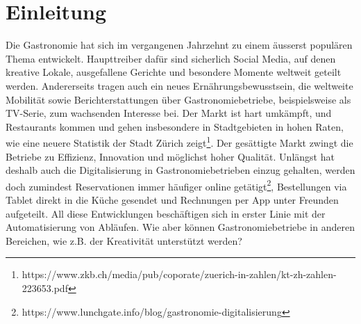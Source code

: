 \section*{Einleitung}
\label{sec:introduction}

Die Gastronomie hat sich im vergangenen Jahrzehnt zu einem äusserst populären Thema entwickelt.
Haupttreiber dafür sind sicherlich Social Media, auf denen kreative Lokale, ausgefallene Gerichte und besondere
Momente weltweit geteilt werden.
Andererseits tragen auch ein neues Ernährungsbewusstsein, die weltweite Mobilität sowie Berichterstattungen über Gastronomiebetriebe, beispielsweise als TV-Serie, zum wachsenden Interesse bei.
Der Markt ist hart umkämpft, und Restaurants kommen und gehen insbesondere in Stadtgebieten in hohen Raten, wie eine neuere
Statistik der Stadt Zürich zeigt\footnote{https://www.zkb.ch/media/pub/coporate/zuerich-in-zahlen/kt-zh-zahlen-223653.pdf}.
Der gesättigte Markt zwingt die Betriebe zu Effizienz, Innovation und möglichst hoher Qualität.
Unlängst hat deshalb auch die Digitalisierung in Gastronomiebetrieben einzug gehalten, werden doch zumindest Reservationen immer
häufiger online getätigt\footnote{https://www.lunchgate.info/blog/gastronomie-digitalisierung}, Bestellungen via Tablet
direkt in die Küche gesendet und Rechnungen per App unter Freunden aufgeteilt.
All diese Entwicklungen beschäftigen sich in erster Linie mit der Automatisierung von Abläufen.
Wie aber können Gastronomiebetriebe in anderen Bereichen, wie z.B. der Kreativität unterstützt werden?


